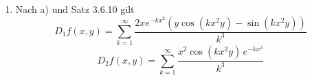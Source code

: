 \documentclass[a4paper,12pt]{article}
\begin{document}
\begin{enumerate}[label=\alph*)]
          Daraus folgt
          \begin{align*}
              \| D_2 g_k(x,y) \|_\infty & = \sup \left\{ |D_2 g_k(x,y)| \,\middle|\, \binom{x}{y} \in U_a \right\} \\
                                        & \leq \frac{c_1}{k^3}
          \end{align*}

          Da die Reihe $\sum_{k=1}^{\infty} \frac{c_1}{k^3}$ konvergiert, können wir das
          Majorantenkriterium (Satz 2.6.8) anwenden und daraus folgt, dass
          $\sum_{k=1}^{\infty} D_2 g_k(x,y) \big|_{U_a}$ gleichmäßig konvergiert.

          Alle Voraussetzungen für Satz 3.6.10 sind erfüllt. Folglich ist die Summenfunktion
          $f = \sum_{k=1}^{\infty} g_k$ in $a$ differenzierbar. Da $a$ beliebig war, ist $f$
          differenzierbar auf ganz $\mathbb{R}^2$.

    \item

          Nach a) und Satz 3.6.10 gilt
          \[
              D_1 f(x,y) = \sum_{k=1}^{\infty} \frac{2 x e^{-kx^2} \left( y \cos(kx^2 y) - \sin(kx^2 y) \right)}{k^3}
          \]
          \[
              D_2 f(x,y) = \sum_{k=1}^{\infty} \frac{x^2 \cos(kx^2 y) \, e^{-kx^2}}{k^3}
          \]

\end{enumerate}
\end{document}
